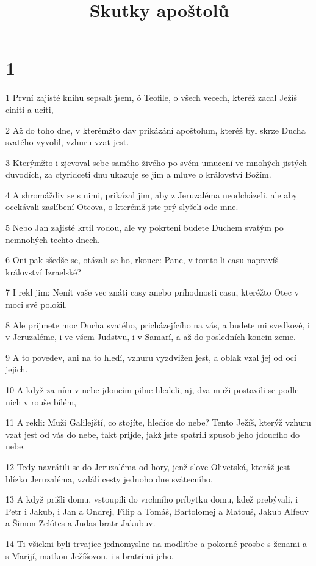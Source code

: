 

\title{Skutky apoštolů}

\chapter{1}

\par 1 První zajisté knihu sepsalt jsem, ó Teofile, o všech vecech, kteréž zacal Ježíš ciniti a uciti,
\par 2 Až do toho dne, v kterémžto dav prikázání apoštolum, kteréž byl skrze Ducha svatého vyvolil, vzhuru vzat jest.
\par 3 Kterýmžto i zjevoval sebe samého živého po svém umucení ve mnohých jistých duvodích, za ctyridceti dnu ukazuje se jim a mluve o království Božím.
\par 4 A shromáždiv se s nimi, prikázal jim, aby z Jeruzaléma neodcházeli, ale aby ocekávali zaslíbení Otcova, o kterémž jste prý slyšeli ode mne.
\par 5 Nebo Jan zajisté krtil vodou, ale vy pokrteni budete Duchem svatým po nemnohých techto dnech.
\par 6 Oni pak sšedše se, otázali se ho, rkouce: Pane, v tomto-li casu napravíš království Izraelské?
\par 7 I rekl jim: Nenít vaše vec znáti casy anebo príhodnosti casu, kteréžto Otec v moci své položil.
\par 8 Ale prijmete moc Ducha svatého, pricházejícího na vás, a budete mi svedkové, i v Jeruzaléme, i ve všem Judstvu, i v Samarí, a až do posledních koncin zeme.
\par 9 A to povedev, ani na to hledí, vzhuru vyzdvižen jest, a oblak vzal jej od ocí jejich.
\par 10 A když za ním v nebe jdoucím pilne hledeli, aj, dva muži postavili se podle nich v rouše bílém,
\par 11 A rekli: Muži Galilejští, co stojíte, hledíce do nebe? Tento Ježíš, kterýž vzhuru vzat jest od vás do nebe, takt prijde, jakž jste spatrili zpusob jeho jdoucího do nebe.
\par 12 Tedy navrátili se do Jeruzaléma od hory, jenž slove Olivetská, kteráž jest blízko Jeruzaléma, vzdálí cesty jednoho dne svátecního.
\par 13 A když prišli domu, vstoupili do vrchního príbytku domu, kdež prebývali, i Petr i Jakub, i Jan a Ondrej, Filip a Tomáš, Bartolomej a Matouš, Jakub Alfeuv a Šimon Zelótes a Judas bratr Jakubuv.
\par 14 Ti všickni byli trvajíce jednomyslne na modlitbe a pokorné prosbe s ženami a s Marijí, matkou Ježíšovou, i s bratrími jeho.
